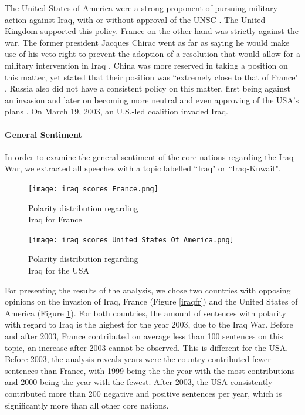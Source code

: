 The United States of America were a strong proponent of pursuing military action against Iraq, with or without approval of the UNSC \citep{usairaq}. The United Kingdom supported this policy.
France on the other hand was strictly against the war. The former president Jacques Chirac went as far as saying he would make use of his veto right to prevent the adoption of a resolution that would allow for a military intervention in Iraq \citep{nyt}.
China was more reserved in taking a position on this matter, yet stated that their position was ``extremely close to that of France" \citep{cnn}. Russia also did not have a consistent policy on this matter, first being against an invasion and later on becoming more neutral and even approving of the USA's plans \citep{russiairaq}.
On March 19, 2003, an U.S.-led coalition invaded Iraq.

\vspace{-5pt}
\paragraph{General Sentiment}
In order to examine the general sentiment of the core nations regarding the Iraq War, we extracted all speeches with a topic labelled ``Iraq" or ``Iraq-Kuwait". 

\begin{figure}[t!]
    \centering
    \begin{minipage}{0.47\textwidth}
        \centering
        \texttt{[image: iraq\_scores\_France.png]} %
        \caption{Polarity distribution regarding \\ Iraq for France}
        \label{iraqfr}
    \end{minipage}\hfill
    \begin{minipage}{0.47\textwidth}
        \centering
        \texttt{[image: iraq\_scores\_United States Of America.png]} %
        \caption{Polarity distribution regarding \\ Iraq for the USA}
        \label{iraqusa}
    \end{minipage}
\end{figure}



For presenting the results of the analysis, we chose two countries with opposing opinions on the invasion of Iraq, France (Figure \ref{iraqfr}) and the United States of America (Figure \ref{iraqusa}).
For both countries, the amount of sentences with polarity with regard to Iraq is the highest for the year 2003, due to the Iraq War. Before and after 2003, France contributed on average less than 100 sentences on this topic, an increase after 2003 cannot be observed. This is different for the USA. Before 2003, the analysis reveals years were the country contributed fewer sentences than France, with 1999 being the the year with the most contributions and 2000 being the year with the fewest. After 2003, the USA consistently contributed more than 200 negative and positive sentences per year, which is significantly more than all other core nations.

